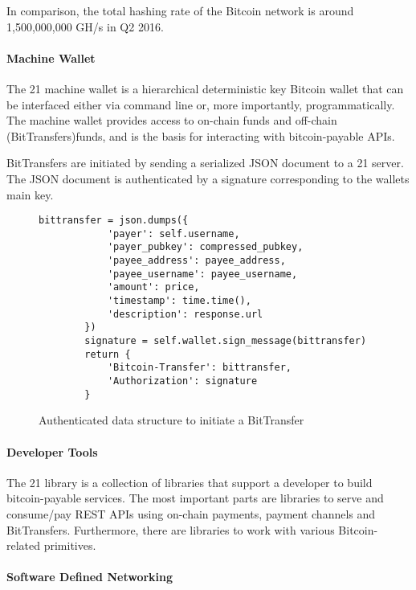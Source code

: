 In comparison, the total hashing rate of the Bitcoin network is around 1,500,000,000 GH/s in Q2 2016. 

\paragraph{Machine Wallet}

The 21 machine wallet is a hierarchical deterministic key Bitcoin wallet that can be interfaced either via command line or, more importantly, programmatically. The machine wallet provides access to on-chain funds and off-chain (BitTransfers)funds, and is the basis for interacting with bitcoin-payable APIs. 

BitTransfers are initiated by sending a serialized JSON document to a 21 server. The JSON document is authenticated by a signature corresponding to the wallets main key. 

\begin{figure}
\label{lst:21bittransfer}
\begin{lstlisting}[breaklines]
        bittransfer = json.dumps({
            'payer': self.username,
            'payer_pubkey': compressed_pubkey,
            'payee_address': payee_address,
            'payee_username': payee_username,
            'amount': price,
            'timestamp': time.time(),
            'description': response.url
        })      
        signature = self.wallet.sign_message(bittransfer)
        return {
            'Bitcoin-Transfer': bittransfer,
            'Authorization': signature
        }
\end{lstlisting}
\caption{Authenticated data structure to initiate a BitTransfer%
}
\end{figure}


\paragraph{Developer Tools}

The 21 library is a collection of libraries that support a developer to build bitcoin-payable services. The most important parts are libraries to serve and consume/pay REST APIs using on-chain payments, payment channels and BitTransfers. Furthermore, there are libraries to work with various Bitcoin-related primitives.  


\paragraph{Software Defined Networking}

